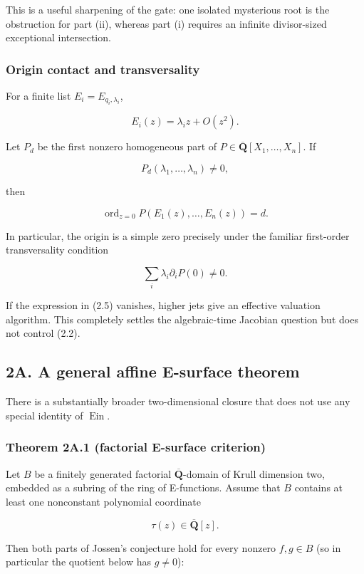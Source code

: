 \documentclass[11pt]{article}
\theoremstyle{keio}
\theoremstyle{definition}
\theoremstyle{remark}
\begin{document}
This is a useful sharpening of the gate: one isolated mysterious root is the
obstruction for part (ii), whereas part (i) requires an infinite divisor-sized
exceptional intersection.

\subsubsection{Origin contact and transversality}

For a finite list \(E_i=E_{q_i,\lambda_i}\),

\[
  E_i(z)=\lambda_i z+O(z^2).
\]

Let \(P_d\) be the first nonzero homogeneous part of
\(P\in\overline{\mathbf Q}[X_1,\ldots,X_n]\). If

\[
  P_d(\lambda_1,\ldots,\lambda_n)\ne0,
\]

then

\[
  \operatorname{ord}_{z=0}P(E_1(z),\ldots,E_n(z))=d.          \tag{J-2.4}
\]

In particular, the origin is a simple zero precisely under the familiar
first-order transversality condition

\[
  \sum_i\lambda_i\partial_iP(0)\ne0.                         \tag{J-2.5}
\]

If the expression in (2.5) vanishes, higher jets give an effective valuation
algorithm. This completely settles the algebraic-time Jacobian question but
does not control (2.2).

\subsection{2A. A general affine E-surface theorem}

There is a substantially broader two-dimensional closure that does not use
any special identity of \(\operatorname{Ein}\).

\subsubsection{Theorem 2A.1 (factorial E-surface criterion)}

Let \(B\) be a finitely generated factorial
\(\overline{\mathbf Q}\)-domain of Krull dimension two, embedded as a
subring of the ring of E-functions. Assume that \(B\) contains at least one
nonconstant polynomial coordinate

\[
  \tau(z)\in\overline{\mathbf Q}[z].
\]

Then both parts of Jossen's conjecture hold for every nonzero
\(f,g\in B\) (so in particular the quotient below has \(g\ne0\)):
\end{document}

